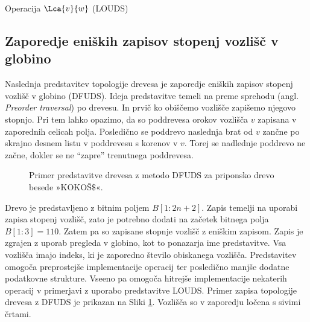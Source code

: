\begin{algorithm}[hbt]

\caption{Operacija $\Lca{v}{w}$ (LOUDS)}\label{alg:LOUDSlca}
{
    
}
\end{algorithm}


\subsection{Zaporedje eniških zapisov stopenj vozlišč v globino}\label{sec:DFUDS}

Naslednja predstavitev topologije drevesa je zaporedje eniških zapisov stopenj vozlišč v globino (DFUDS). Ideja predstavitve temeli na preme sprehodu (angl. \textit{Preorder traversal}) po drevesu. In prvič ko obiščemo vozlišče zapišemo njegovo stopnjo. Pri tem lahko opazimo, da so poddrevesa orokov vozlišča $v$ zapisana v zaporednih celicah polja. Posledično se poddrevo naslednja brat od $v$ zančne po skrajno desnem listu v poddrevesu s korenov v $v$. Torej se nadlednje poddrevo ne začne, dokler se ne \enquote{zapre} trenutnega poddrevesa. 
\begin{figure}[htb]
    \begin{center}
        
        \caption{Primer predstavitve drevesa z metodo DFUDS za priponsko drevo besede »KOKOŠ$\$$«.} 
        \label{fig:DFUDS}
    \end{center}
\end{figure}

Drevo je predstavljeno z bitnim poljem $B[1:2n+2]$. Zapis temelji na uporabi zapisa stopenj vozlišč, zato je potrebno dodati na začetek bitnega polja $B[1:3]=110$. Zatem pa so zapisane stopnje vozlišč z eniškim zapisom. Zapis je zgrajen z uporab pregleda v globino, kot to ponazarja ime predstavitve. Vsa vozlišča imajo indeks, ki je zaporedno število obiskanega vozlišča. Predstavitev omogoča preprostejše implementacije operacij ter posledično manjše dodatne podatkovne strukture. Vseeno pa omogoča hitrejše implementacije nekaterih operacij v primerjavi z uporabo predstavitve LOUDS. Primer zapisa topologije drevesa z DFUDS je prikazan na Sliki \ref{fig:DFUDS}. Vozlišča so v zaporedju ločena s sivimi črtami.

